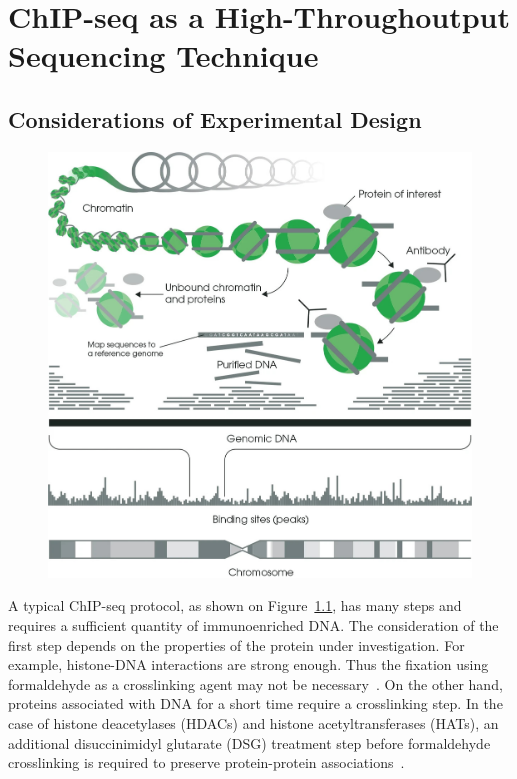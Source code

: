 \chapter{ChIP-seq as a High-Throughoutput Sequencing Technique}

\section{Considerations of Experimental Design}

\begin{figure}[b!]
    \centering
    \includegraphics[width=\textwidth]{../img/chip.jpeg}
    \label{chip}
\end{figure}

A typical ChIP-seq protocol, as shown on Figure~\ref{chip}, has many steps and requires a sufficient quantity of immunoenriched DNA. 
The consideration of the first step depends on the properties of the protein under investigation. 
For example, histone-DNA interactions are strong enough. 
Thus the fixation using formaldehyde as a crosslinking agent may not be necessary~\cite{barski2008identification}. 
On the other hand, proteins associated with DNA for a short time require a crosslinking step. 
In the case of histone deacetylases (HDACs) and histone acetyltransferases (HATs), an additional disuccinimidyl glutarate (DSG) treatment step before formaldehyde crosslinking is required to preserve protein-protein associations~\cite{wang2009genome}. 


